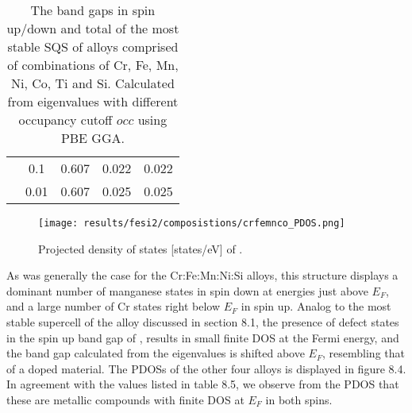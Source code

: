 \begin{table}[H]
\begin{tabular}{@{}ccccc@{}}
\multicolumn{1}{c|}{}                             & \multicolumn{1}{c|}{0.1}  & 0.607                                                                         & 0.022                                                                        & 0.022                                                                         \\
\multicolumn{1}{c|}{}                             & \multicolumn{1}{c|}{0.01}                      & 0.607                                                                         & 0.025                                                                        & 0.025                                                                         \\ \bottomrule
\end{tabular}
\caption{The band gaps in spin up/down and total of the most stable SQS of alloys comprised of combinations of Cr, Fe, Mn, Ni, Co, Ti and Si. Calculated from eigenvalues with different occupancy cutoff $occ$ using PBE GGA.}
\end{table}

\begin{figure}[H]
\centering
\texttt{[image: results/fesi2/composistions/crfemnco\_PDOS.png]}
\caption{Projected density of states [states/eV] of .}
\end{figure}

As was generally the case for the Cr:Fe:Mn:Ni:Si alloys, this structure displays a dominant number of manganese states in spin down at energies just above $E_F$, and a large number of Cr states right below $E_F$ in spin up. Analog to the most stable supercell of the  alloy discussed in section 8.1, the presence of defect states in the spin up band gap of , results in small finite DOS at the Fermi energy, and the band gap calculated from the eigenvalues is shifted above $E_F$, resembling that of a doped material. The PDOSs of the other four alloys is displayed in figure 8.4. In agreement with the values listed in table 8.5, we observe from the PDOS that these are metallic compounds with finite DOS at $E_F$ in both spins. 
 
